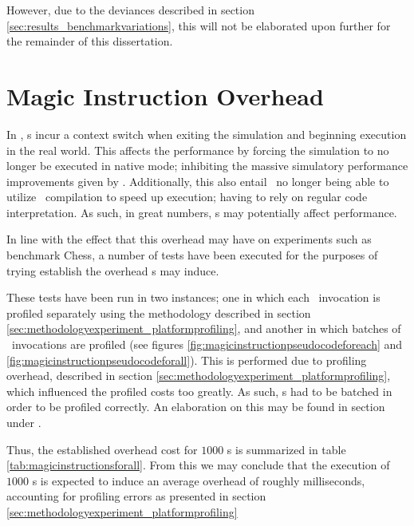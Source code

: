 However, due to the deviances described in section \ref{sec:results_benchmarkvariations}, this will not be elaborated upon further for the remainder of this dissertation.




\section{Magic Instruction Overhead}
\label{sec:results_magicinstructionoverhead}
In \dvttermsimics , \dvttermmagicinstruction s incur a context switch when exiting the simulation and beginning execution in the real world.
This affects the performance by forcing the simulation to no longer be executed in native mode; inhibiting the massive simulatory performance improvements given by \dvttermhostvirtualizationextensions .
Additionally, this also entail \dvttermsimics\ no longer being able to utilize \dvttermjit\ compilation to speed up execution; having to rely on regular code interpretation.
As such, in great numbers, \dvttermmagicinstruction s may potentially affect performance. 

In line with the effect that this overhead may have on experiments such as benchmark Chess, a number of tests have been executed for the purposes of trying establish the overhead \dvttermmagicinstruction s may induce.

These tests have been run in two instances; one in which each \dvttermmagicinstruction\ invocation is profiled separately using the methodology described in section \ref{sec:methodologyexperiment_platformprofiling}, and another in which batches of \dvttermmagicinstruction\ invocations are profiled (see figures \ref{fig:magicinstructionpseudocodeforeach} and \ref{fig:magicinstructionpseudocodeforall}).
This is performed due to profiling overhead, described in section \ref{sec:methodologyexperiment_platformprofiling}, which influenced the profiled costs too greatly.
As such, \dvttermmagicinstruction s had to be batched in order to be profiled correctly.
An elaboration on this may be found in section  under .



Thus, the established overhead cost for $1000$ \dvttermmagicinstruction s is summarized in table \ref{tab:magicinstructionsforall}.
From this we may conclude that the execution of $1000$ \dvttermmagicinstruction s is expected to induce an average overhead of roughly  milliseconds, accounting for profiling errors as presented in section \ref{sec:methodologyexperiment_platformprofiling}

